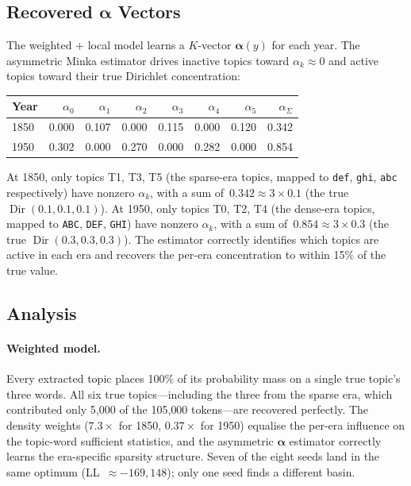\documentclass[11pt]{article}
\begin{document}
\subsection{Recovered $\boldsymbol\alpha$ Vectors}

The weighted + local model learns a $K$-vector $\boldsymbol\alpha(y)$ for each year.
The asymmetric Minka estimator drives inactive topics toward $\alpha_k \approx 0$ and active topics toward their true Dirichlet concentration:

\begin{center}
\begin{tabular}{@{}l rrrrrr r@{}}
\toprule
\textbf{Year} & $\alpha_0$ & $\alpha_1$ & $\alpha_2$ & $\alpha_3$ & $\alpha_4$ & $\alpha_5$ & $\alpha_\Sigma$ \\
\midrule
1850 & 0.000 & 0.107 & 0.000 & 0.115 & 0.000 & 0.120 & 0.342 \\
1950 & 0.302 & 0.000 & 0.270 & 0.000 & 0.282 & 0.000 & 0.854 \\
\bottomrule
\end{tabular}
\end{center}

At 1850, only topics T1, T3, T5 (the sparse-era topics, mapped to \texttt{def}, \texttt{ghi}, \texttt{abc} respectively) have nonzero $\alpha_k$, with a sum of~$0.342 \approx 3 \times 0.1$ (the true $\operatorname{Dir}(0.1,0.1,0.1)$).
At 1950, only topics T0, T2, T4 (the dense-era topics, mapped to \texttt{ABC}, \texttt{DEF}, \texttt{GHI}) have nonzero $\alpha_k$, with a sum of~$0.854 \approx 3 \times 0.3$ (the true $\operatorname{Dir}(0.3,0.3,0.3)$).
The estimator correctly identifies which topics are active in each era and recovers the per-era concentration to within 15\% of the true value.

\subsection{Analysis}

\paragraph{Weighted model.}
Every extracted topic places 100\% of its probability mass on a single true topic's three words.
All six true topics---including the three from the sparse era, which contributed only 5{,}000 of the 105{,}000 tokens---are recovered perfectly.
The density weights ($7.3\times$ for 1850, $0.37\times$ for 1950) equalise the per-era influence on the topic-word sufficient statistics, and the asymmetric $\boldsymbol\alpha$ estimator correctly learns the era-specific sparsity structure.
Seven of the eight seeds land in the same optimum (LL~$\approx -169{,}148$); only one seed finds a different basin.
\end{document}
